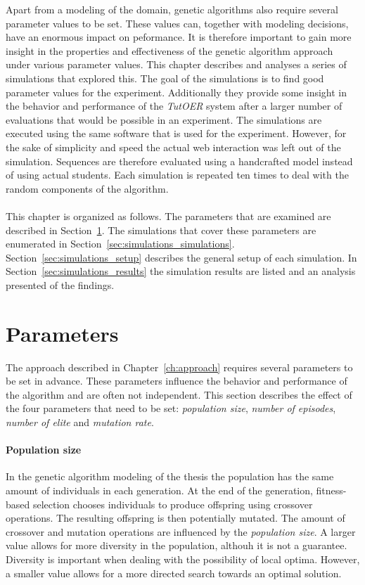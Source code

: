 Apart from a modeling of the domain, genetic algorithms also require several
parameter values to be set. These values can, together with modeling decisions,
have an enormous impact on peformance. It is therefore important to gain more
insight in the properties and effectiveness of the genetic algorithm approach
under various parameter values. This chapter describes and analyses a series of
simulations that explored this. The goal of the simulations is to find good
parameter values for the experiment. Additionally they provide some insight in
the behavior and performance of the \emph{TutOER} system after a larger number
of evaluations that would be possible in an experiment. The simulations are
executed using the same software that is used for the experiment. However, for
the sake of simplicity and speed the actual web interaction was left out of the
simulation. Sequences are therefore evaluated using a handcrafted model instead
of using actual students. Each simulation is repeated ten times to deal with
the random components of the algorithm.\\\\
\noindent
This chapter is organized as follows. The parameters that are examined are
described in Section~\ref{sec:simulations_parameters}.  The simulations that
cover these parameters are enumerated in
Section~\ref{sec:simulations_simulations}. Section~\ref{sec:simulations_setup}
describes the general setup of each simulation. In
Section~\ref{sec:simulations_results} the simulation results are listed and an
analysis presented of the findings.

\section{Parameters}
\label{sec:simulations_parameters}
The approach described in Chapter~\ref{ch:approach} requires several parameters
to be set in advance. These parameters influence the behavior and performance
of the algorithm and are often not independent. This section describes the
effect of the four parameters that need to be set: \emph{population size},
\emph{number of episodes}, \emph{number of elite} and \emph{mutation rate}.
\paragraph{Population size} In the genetic algorithm modeling of the thesis
the population has the same amount of individuals in each generation. At the
end of the generation, fitness-based selection chooses individuals to produce
offspring using crossover operations. The resulting offspring is then
potentially mutated. The amount of crossover and mutation operations are
influenced by the \emph{population size}. A larger value allows for more
diversity in the population, althouh it is not a guarantee. Diversity is
important when dealing with the possibility of local optima. However, a smaller
value allows for a more directed search towards an optimal solution.
